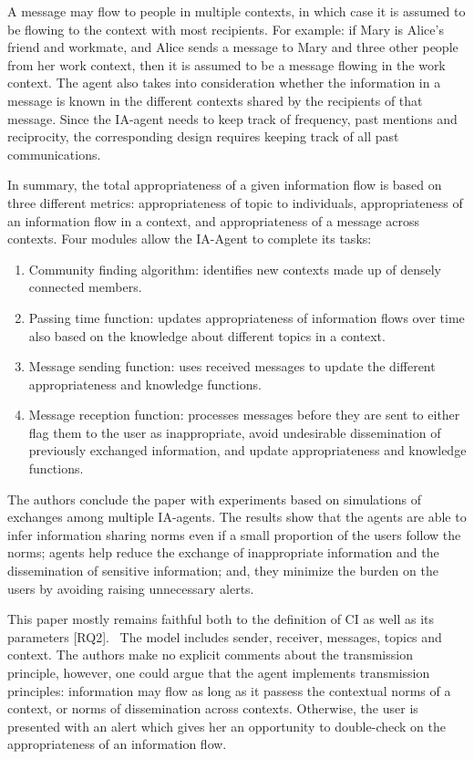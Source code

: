 \documentclass[../thesis.tex]{subfiles}
\newcommand\liststyleWWNumiii{%
\renewcommand\theenumi{\arabic{enumi}}
\renewcommand\theenumii{\alph{enumii}}
\renewcommand\theenumiii{\roman{enumiii}}
\renewcommand\theenumiv{\arabic{enumiv}}
\renewcommand\labelenumi{\theenumi.}
\renewcommand\labelenumii{\theenumii.}
\renewcommand\labelenumiii{\theenumiii.}
\renewcommand\labelenumiv{\theenumiv.}
}
\begin{document}
A message may flow to people in multiple contexts, in which case it is
assumed to be flowing to the context with most recipients. For example:
if Mary is Alice's friend and workmate, and Alice sends
a message to Mary and three other people from her work context, then it
is assumed to be a message flowing in the work context. The agent also
takes into consideration whether the information in a message is known
in the different contexts shared by the recipients of that message.
Since the IA-agent needs to keep track of frequency, past mentions and
reciprocity, the corresponding design requires keeping track of all
past communications. 

In summary, the total appropriateness of a given information flow is
based on three different metrics: appropriateness of topic to
individuals, appropriateness of an information flow in a context, and
appropriateness of a message across contexts. Four modules allow the
IA-Agent to complete its tasks: 

\liststyleWWNumiii
\begin{enumerate}
\item Community finding algorithm: identifies new contexts made up of
densely connected members.
\item Passing time function: updates appropriateness of information
flows over time also based on the knowledge about different topics in a
context.
\item Message sending function: uses received messages to update the
different appropriateness and knowledge functions.
\item Message reception function: processes messages before they are
sent to either flag them to the user as inappropriate, avoid
undesirable dissemination of previously exchanged information, and
update appropriateness and knowledge functions.
\end{enumerate}
The authors conclude the paper with experiments based on simulations of
exchanges among multiple IA-agents. The results show that the agents
are able to infer information sharing norms even if a small proportion
of the users follow the norms; agents help reduce the exchange of
inappropriate information and the dissemination of sensitive
information; and, they minimize the burden on the users by avoiding
raising unnecessary alerts.

This paper mostly remains faithful both to the definition of CI as well
as its parameters [RQ2]. \ The model includes sender, receiver,
messages, topics and context. The authors make no explicit comments
about the transmission principle, however, one could argue that the
agent implements transmission principles: information may flow as long
as it passess the contextual norms of a context, or norms of
dissemination across contexts. Otherwise, the user is presented with an
alert which gives her an opportunity to double-check on the
appropriateness of an information flow.
\end{document}
